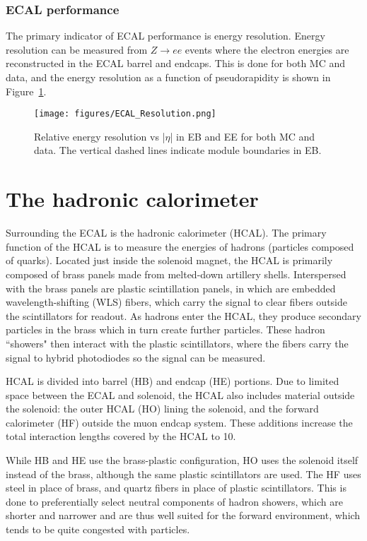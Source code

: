 \subsubsection{ECAL performance}

The primary indicator of ECAL performance is energy resolution. Energy resolution can be measured from $Z\to ee$ events where the electron energies are reconstructed in the ECAL barrel and endcaps. This is done for both MC and data, and the energy resolution as a function of pseudorapidity is shown in Figure~\ref{fig:ECAL_Resolution}. \cite{ECAL}

\begin{figure}\centering
  \texttt{[image: figures/ECAL\_Resolution.png]}
  \caption{\label{fig:ECAL_Resolution} Relative energy resolution vs |$\eta$| in EB and EE for both MC and data. The vertical dashed lines indicate module boundaries in EB.}
\end{figure}





\section{The hadronic calorimeter}

Surrounding the ECAL is the hadronic calorimeter (HCAL). The primary function of the HCAL is to measure the energies of hadrons (particles composed of quarks). Located just inside the solenoid magnet, the HCAL is primarily composed of brass panels made from melted-down artillery shells. Interspersed with the brass panels are plastic scintillation panels, in which are embedded wavelength-shifting (WLS) fibers, which carry the signal to clear fibers outside the scintillators for readout. As hadrons enter the HCAL, they produce secondary particles in the brass which in turn create further particles. These hadron ``showers" then interact with the plastic scintillators, where the fibers carry the signal to hybrid photodiodes so the signal can be measured.

HCAL is divided into barrel (HB) and endcap (HE) portions. Due to limited space between the ECAL and solenoid, the HCAL also includes material outside the solenoid: the outer HCAL (HO) lining the solenoid, and the forward calorimeter (HF) outside the muon endcap system. These additions increase the total interaction lengths covered by the HCAL to 10.\cite{TDR}

While HB and HE use the brass-plastic configuration, HO uses the solenoid itself instead of the brass, although the same plastic scintillators are used. The HF uses steel in place of brass, and quartz fibers in place of plastic scintillators. This is done to preferentially select neutral components of hadron showers, which are shorter and narrower and are thus well suited for the forward environment, which tends to be quite congested with particles.

